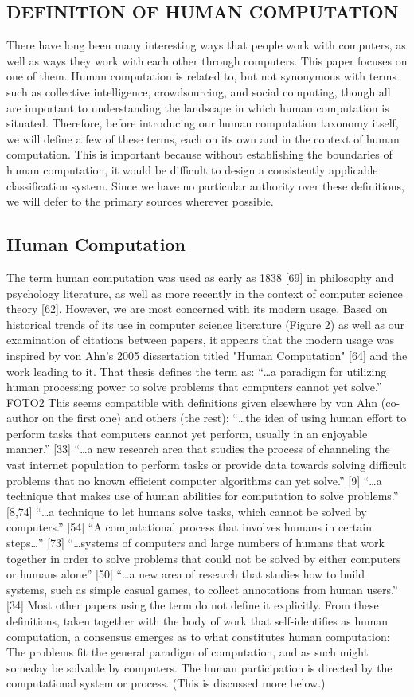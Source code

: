 \documentclass{sig-alternate}
\begin{document}
\subsection*{DEFINITION OF HUMAN COMPUTATION}
There have long been many interesting ways that people work with computers, as well as ways they work with each other through computers. This paper focuses on one of them. Human computation is related to, but not synonymous with terms such as collective intelligence, crowdsourcing, and social computing, though all are important to understanding the landscape in which human computation is situated. Therefore, before introducing our human computation taxonomy itself, we will define a few of these terms, each on its own and in the context of human computation. This is important because without establishing the boundaries of human computation, it would be difficult to design a consistently applicable classification system. Since we have no particular authority over these definitions, we will defer to the primary sources wherever possible.
\subsection*{Human Computation}
The term human computation was used as early as 1838 [69] in philosophy and psychology literature, as well as more recently in the context of computer science theory [62]. However, we are most concerned with its modern usage. Based on historical trends of its use in computer science literature (Figure 2) as well as our examination of citations between papers, it appears that the modern usage was inspired by von Ahn’s 2005 dissertation titled "Human Computation" [64] and the work leading to it. That thesis defines the term as:
“…a paradigm for utilizing human processing power to solve problems that computers cannot yet solve.” FOTO2
This seems compatible with definitions given elsewhere by von Ahn (co-author on the first one) and others (the rest):
“…the idea of using human effort to perform tasks that computers cannot yet perform, usually in an enjoyable manner.” [33]
“…a new research area that studies the process of channeling the vast internet population to perform tasks or provide data towards solving difficult problems that no known efficient computer algorithms can yet solve.” [9]
“…a technique that makes use of human abilities for computation to solve problems.” [8,74]
“…a technique to let humans solve tasks, which cannot be solved by computers.” [54]
“A computational process that involves humans in certain steps…” [73]
“…systems of computers and large numbers of humans that work together in order to solve problems that could not be solved by either computers or humans alone” [50]
“…a new area of research that studies how to build systems, such as simple casual games, to collect annotations from human users.” [34]
Most other papers using the term do not define it explicitly. From these definitions, taken together with the body of work that self-identifies as human computation, a consensus emerges as to what constitutes human computation:
 The problems fit the general paradigm of computation, and as such might someday be solvable by computers.
 The human participation is directed by the computational system or process. (This is discussed more below.)
\end{document}
